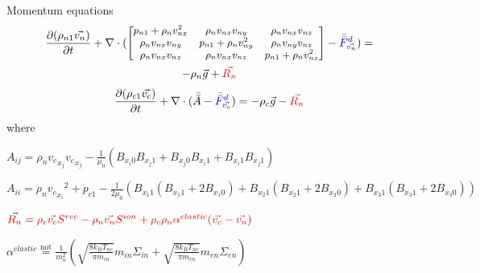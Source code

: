 \documentclass{beamer}
\begin{document}
\begin{frame}{Momentum equations}
\begin{multline*}
 \frac{\partial (\rho_{n1} \vec{v_n})  }{\partial t} + \nabla \cdot( 
\begin{small}
\begin{bmatrix}
p_{n1} + \rho_n v_{nx}^2 &  \rho_n v_{nx} v_{ny} &  \rho_n v_{nx} v_{nz}\\ 
\rho_n v_{nx} v_{ny} &  p_{n1} + \rho_n v_{ny}^2  &  \rho_n v_{ny} v_{nz}\\ 
\rho_n v_{nx} v_{nz}&   \rho_n v_{nx} v_{nz} &p_{n1} + \rho_n v_{nz}^2   
\end{bmatrix}
\end{small}
 - {\color{blue} \bar{\bar{F}}^d_{\vec{v_n}} } )= \\
-\rho_n \vec{g} + {\color{red}  \vec{R_n}  }  
\end{multline*}
\[ \frac{\partial (\rho_{c1} \vec{v_c})  }{\partial t} + \nabla \cdot(\bar{\bar{A}}- {\color{blue} \bar{\bar{F}}^d_{\vec{v_c}} }  )=
-\rho_c \vec{g} - {\color{red}   \vec{R_n} }  \]
where

\begin{small}
$A_{ij} = \rho_n {v_c}_{x_j} {v_c}_{x_j} - \frac{1}{\mu_0}(B_{x_i 0}B_{x_j 1} + B_{x_j0}B_{x_i1}  + B_{x_i1}B_{x_j1}  ) $ 

$A_{ii} = \rho_n {{v_c}_{x_i}}^2 + p_{c1}  - \frac{1}{2 \mu_0}(B_{x_1 1} (B_{x_1 1} + 2  B_{x_1 0} )+ B_{x_2 1} (B_{x_2 1} + 2  B_{x_2 0} ) + B_{x_3 1} (B_{x_3 1} + 2  B_{x_3 0} ))$

\end{small}

${\color{red} \vec{R_n} = \rho_c \vec{v_c} S^{rec} - \rho_n \vec{v_n} S^{ion} +\rho_c \rho_n \alpha^{elastic} (\vec{v_c} - \vec{v_n}) } $

$\alpha^{elastic} \stackrel{\text{not}}{=}  \frac{1}{m_n^2}(\sqrt{\frac{8 k_B T_{nc}}{\pi m_{in}}} m_{in} \Sigma_{in} +  \sqrt{\frac{8 k_B T_{nc}}{\pi m_{en}}} m_{en} \Sigma_{en}) $ 
\end{frame}
\end{document}
